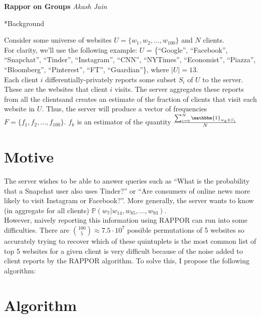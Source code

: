\documentclass[12pt]{article}
\newcommand{\myhwtitle}[3]
{\begin{center}
{\large {\bf {#1}}}
\medskip 
{\it {#2}} %
\end{center}}
\begin{document}
\pagestyle{plain}

\myhwtitle{Rappor on Groups}{Akash Jain}

\section*{Background}

Consider some universe of websites $U = \{w_1, w_2, \ldots, w_{100}\}$ and $N$ clients.\\

For clarity, we'll use the following example: $U$ = \{``Google'', ``Facebook'', ``Snapchat'', ``Tinder'', ``Instagram'', ``CNN'', ``NYTimes'', ``Economist'', ``Piazza'', ``Bloomberg'', ``Pinterest'', ``FT'', ``Guardian''\}, where $|U| = 13$.\\

Each client $i$ differentially-privately reports some subset $S_i$ of $U$ to the server. These are the websites that client $i$ visits. The server aggregates these reports from all the clientsand creates an estimate of the fraction of clients that visit each website in $U$. Thus, the server will produce a vector of frequencies $F = \{f_1, f_2, \ldots, f_{100}\}$. $f_k$ is an estimator of the quantity $\frac{\sum_{i = 0}^N \mathbbm{1}_{w_k \in S_i}}{N}$

\section*{Motive}

The server wishes to be able to answer queries such as ``What is the probability that a Snapchat user also uses Tinder?'' or ``Are consumers of online news more likely to visit Instagram or Facebook?''. More generally, the server wants to know (in aggregate for all clients) $\mathbb{P}(w_7 | w_{14}, w_{85}, \ldots, w_{93})$.\\

However, naively reporting this information using RAPPOR can run into some difficulties. There are ${100 \choose 5} \approx 7.5 \cdot 10^7$ possible permutations of 5 websites so accurately trying to recover which of these quintuplets is the most common list of top 5 websites for a given client is very difficult because of the noise added to client reports by the RAPPOR algorithm. To solve this, I propose the following algorithm:

\section*{Algorithm}
\end{document}
